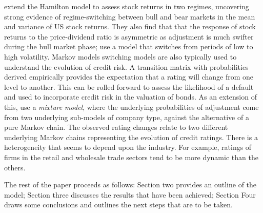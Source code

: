 \documentclass[12pt, a4paper, oneside]{article}\usepackage[]{graphicx}\usepackage[]{color}
\begin{document}
\citet{schaller1997regime} extend the Hamilton model to assess stock returns in two regimes, uncovering strong evidence of regime-switching between bull and bear markets in the mean and variance of US stock returns.  They also find that that the response of stock returns to the price-dividend ratio is asymmetric as adjustment is much swifter during the bull market phase; \citet{dueker1997markov} use a model that switches from periods of low to high volatility. Markov models switching models are also typically used to understand the evolution of credit risk.  A transition matrix with probabilities derived empirically provides the expectation that a rating will change from one level to another.  This can be rolled forward to assess the likelihood of a default and used to incorporate credit risk in the valuation of bonds.  As an extension of this,  \citet{frydman2008credit} use a \emph{mixture model}, where the underlying probabilities of adjustment come from two underlying sub-models of company type, against the alternative of a pure Markov chain. The observed rating changes relate to two different underlying Markov chains representing the evolution of credit ratings.  There is a heterogeneity that seems to depend upon the industry.  For example, ratings of firms in the retail and wholesale trade sectors tend to be more dynamic than the others. 

The rest of the paper proceeds as follows:  Section two provides an outline of the model; Section three discusses the results that have been achieved; Section Four draws some conclusions and outlines the next steps that are to be taken. 


\end{document}
